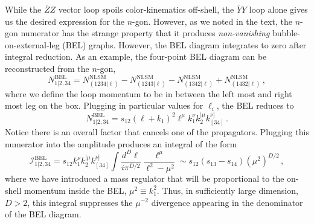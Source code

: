 \documentclass[11pt,letter]{article}
\begin{document}
While the $\bar{Z}Z$ vector loop spoils color-kinematics off-shell, the $\bar{Y}Y$ loop alone gives us the desired expression for the $n$-gon. However, as we noted in the text, the $n$-gon numerator has the strange property that it produces \textit{non-vanishing} bubble-on-external-leg (BEL) graphs. However, the BEL diagram integrates to zero after integral reduction.
As an example, the four-point BEL diagram can be reconstructed from the $n$-gon,
\begin{equation}
N^{\text{BEL}}_{1|2,34} = N^{\text{NLSM}}_{(1234|\ell)}-N^{\text{NLSM}}_{(1243|\ell)}-N^{\text{NLSM}}_{(1342|\ell)}+N^{\text{NLSM}}_{(1432|\ell)}\, ,
\end{equation}
where we define the loop momentum to be in between the left most and right most leg on the box. Plugging in particular values for $\ell_i$, the BEL reduces to
\begin{equation}
N^{\text{BEL}}_{1|2,34} = s_{12} (\ell+k_1)^2 \ell^{\mu} k_1^{\nu} k_2^{[\mu} k_{[34]}^{\nu]} \,.
\end{equation}
Notice there is an overall factor that cancels one of the propagators. Plugging this numerator into the amplitude produces an integral of the form
\begin{equation}
\mathcal{I}^{\text{BEL}}_{1|2,34} = s_{12} k_1^{\nu} k_2^{[\mu} k_{[34]}^{\nu]} \int \frac{d^D \ell}{i\pi^{D/2}} \frac{\ell^\mu }{\ell^2-\mu^2} \sim   s_{12}(s_{13}-s_{14}) (\mu^2)^{D/2}\, ,
\end{equation}
where we have introduced a mass regulator that will be proportional to the on-shell momentum inside the BEL, $\mu^2 \equiv k_1^2$. Thus, in sufficiently large dimension, $D>2$, this integral suppresses the $\mu^{-2}$ divergence appearing in the denominator of the BEL diagram. 



\end{document}
